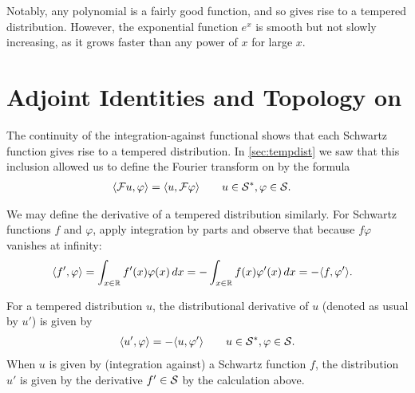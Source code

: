   Notably, any polynomial is a fairly good function, and so gives rise to a tempered distribution.
  However, the exponential function $e^x$ is smooth but not slowly increasing, as it grows faster than any power of $x$ for large $x$.
%

  \section{Adjoint Identities and Topology on \SS}
    The continuity of the integration-against functional shows that each Schwartz function gives rise to a tempered distribution.
    In \cref{sec:tempdist} we saw that this inclusion allowed us to define the Fourier transform on \SS by the formula
    \begin{align*}
      \langle\F u, \varphi\rangle &= \langle u, \F\varphi\rangle
      \qquad u\in\SS, \varphi\in\S \text{.}
    \end{align*}
    
    We may define the derivative of a tempered distribution similarly.
    For Schwartz functions $f$ and $\varphi$, apply integration by parts and observe that because $f\varphi$ vanishes at infinity:
    \begin{align*}
      \langle f', \varphi\rangle
      &= \int_{x\in\R} f'(x)\varphi(x)\,dx
      = -\int_{x\in\R} f(x)\varphi'(x)\,dx
      = -\langle f,\varphi'\rangle\text{.}
    \end{align*}
    \begin{defn}
      For a tempered distribution $u$, the distributional derivative of $u$ (denoted as usual by $u'$) is given by
      \begin{align*}
        \langle u', \varphi\rangle = -\langle u, \varphi'\rangle
        \qquad u\in\SS,\varphi\in\S \text{.}
      \end{align*}
      When $u$ is given by (integration against) a Schwartz function $f$, the distribution $u'$ is given by the derivative $f'\in\S$ by the calculation above. 
    \end{defn}
    

